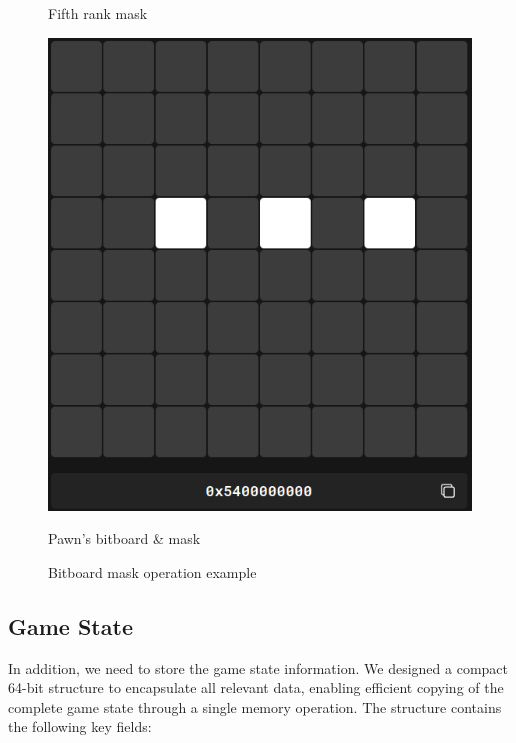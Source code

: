\begin{figure}[H]
\begin{minipage}[c]{0.30\textwidth}
        \caption*{Fifth rank mask}
    \end{minipage}
    \hfill
    \begin{minipage}[c]{0.30\textwidth}
        \centering
        \includegraphics[width=\textwidth]{Imagenes/bitboardMaskResult.png}
        \caption*{Pawn's bitboard \& mask}
    \end{minipage}
    \caption{Bitboard mask operation example}
    \label{fig:bitboardMaskOperation}
    \vspace{-\baselineskip}
\end{figure}

\subsection{Game State}

\noindent In addition, we need to store the game state information. We designed a compact 64-bit structure to encapsulate all relevant data, enabling efficient copying of the complete game state through a single memory operation. The structure contains the following key fields:

